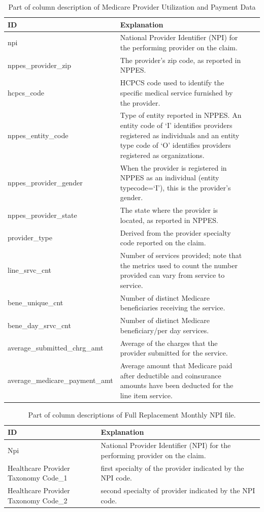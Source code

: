 \documentclass[dvipdfmx, english]{ampmt}             %
\begin{document}
\begin{table}[H]
\centering
\caption{Part of column description of Medicare Provider Utilization and Payment Data\cite{Puf}\label{tb:payment}}
\begin{tabularx}{\linewidth}{lXlX}
  \hline \hline
ID & Explanation \\
  \hline
npi & National Provider Identifier (NPI) for the performing provider on the claim.  \\
  nppes\_provider\_zip & The provider's zip code, as reported in NPPES.  \\
  hcpcs\_code & HCPCS code used to identify the specific medical service furnished by the provider. \\
  nppes\_entity\_code & Type of entity reported in NPPES. An entity code of ‘I’ identifies providers registered as individuals and an entity type code of ‘O’ identifies providers registered as organizations. \\
  nppes\_provider\_gender & When the provider is registered in NPPES as an individual (entity typecode=‘I’), this is the provider’s gender. \\
  nppes\_provider\_state  & The state where the provider is located, as reported in NPPES. \\
  provider\_type & Derived from the provider specialty code reported on the claim. \\
   line\_srvc\_cnt & Number of services provided; note that the metrics used to count the number provided can vary from service to service. \\
   bene\_unique\_cnt & Number of distinct Medicare beneficiaries receiving the service.\\
   bene\_day\_srvc\_cnt  &Number of distinct Medicare beneficiary/per day services.\\
  average\_submitted\_chrg\_amt & Average of the charges that the provider submitted for the service. \\ 
  average\_medicare\_payment\_amt & Average amount that Medicare paid after deductible and coinsurance amounts have been deducted for the line item service. \\ \hline
\end{tabularx}
\addtocounter{table}{-1}
\end{table}


\begin{table}[H]
\centering
\caption{Part of column descriptions of Full Replacement Monthly NPI file.}
\label{tb:npi}
\begin{tabularx}{\linewidth}{ l X}
  \hline \hline
ID & Explanation \\
\hline
Npi & National Provider Identifier (NPI) for the performing provider on the claim. \\
  Healthcare Provider Taxonomy Code\_1 & first specialty of the provider indicated by the NPI code. \\
  Healthcare Provider Taxonomy Code\_2 & second specialty of provider indicated by the NPI code. \\ \hline
\end{tabularx}
\addtocounter{table}{-1}
\end{table}
\end{document}
